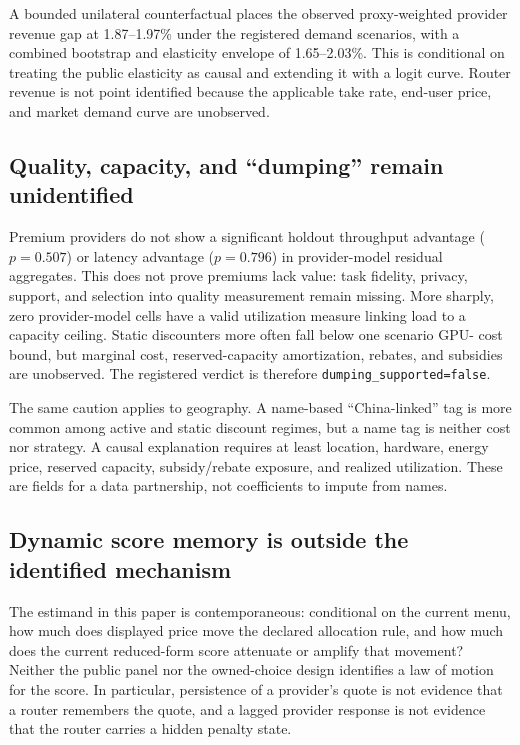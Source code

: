 \documentclass[sigconf,nonacm]{acmart}
\newcommand{\1}{\mathbf 1}
\begin{document}
A bounded unilateral counterfactual places the observed proxy-weighted provider
revenue gap at 1.87--1.97\% under the registered demand scenarios, with a
combined bootstrap and elasticity envelope of 1.65--2.03\%.  This is conditional
on treating the public elasticity as causal and extending it with a logit curve.
Router revenue is not point identified because the applicable take rate,
end-user price, and market demand curve are unobserved.

\subsection{Quality, capacity, and ``dumping'' remain unidentified}

Premium providers do not show a significant holdout throughput advantage
($p=0.507$) or latency advantage ($p=0.796$) in provider-model residual
aggregates.  This does not prove premiums lack value: task fidelity, privacy,
support, and selection into quality measurement remain missing.  More sharply,
zero provider-model cells have a valid utilization measure linking load to a
capacity ceiling.  Static discounters more often fall below one scenario GPU-
cost bound, but marginal cost, reserved-capacity amortization, rebates, and
subsidies are unobserved.  The registered verdict is therefore
\texttt{dumping\_supported=false}.

The same caution applies to geography.  A name-based ``China-linked'' tag is
more common among active and static discount regimes, but a name tag is neither
cost nor strategy.  A causal explanation requires at least location, hardware,
energy price, reserved capacity, subsidy/rebate exposure, and realized
utilization.  These are fields for a data partnership, not coefficients to
impute from names.

\subsection{Dynamic score memory is outside the identified mechanism}

The estimand in this paper is contemporaneous: conditional on the current menu,
how much does displayed price move the declared allocation rule, and how much
does the current reduced-form score attenuate or amplify that movement?  Neither
the public panel nor the owned-choice design identifies a law of motion for the
score.  In particular, persistence of a provider's quote is not evidence that a
router remembers the quote, and a lagged provider response is not evidence that
the router carries a hidden penalty state.
\end{document}

